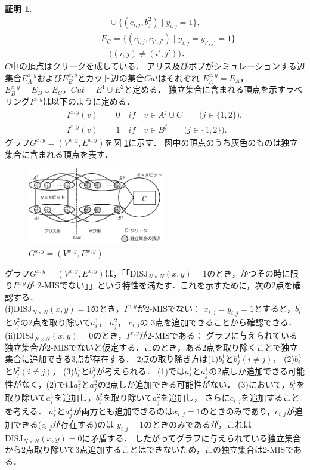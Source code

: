 \documentclass[11pt,a4paper]{jarticle}
\theoremstyle{definition}
\newtheorem*{prf*}{証明}
\begin{document}
\begin{prf*}
\begin{align*}
&\phantom{=} \quad \quad \cup \{(c_{i,j},b^{2}_{j}) \mid y_{i,j}=1\}, \\
&\phantom{=} \quad E_{C} = \{(c_{i,j}, c_{i',j'}) \mid y_{i,j}=y_{i',j'}=1\} \\
&\phantom{=} \quad \quad \text{($(i, j) \neq (i', j')$)}．
\end{align*}
$C$中の頂点はクリークを成している．
アリス及びボブがシミュレーションする辺集合$E^{x,y}_A$および$E^{x,y}_B$とカット辺の集合$\mathit{Cut}$はそれぞれ
$E^{x,y}_{A} = E_{A}$，$E^{x,y}_{B} = E_{B} \cup E_{C}$，$\mathit{Cut} = E^{1} \cup E^{2}$と定める．
独立集合に含まれる頂点を示すラベリング$I^{x,y}$は以下のように定める．
\begin{align*}
I^{x,y}(v) &= 0 \quad if \quad v \in A^{j} \cup C \quad \quad \text{($j \in \{1, 2\}$)}, \\
I^{x,y}(v) &= 1 \quad if \quad v \in B^{j} \quad \quad \text{($j \in \{1, 2\}$)}.
\end{align*}
グラフ$G^{x, y} = (V^{x,y}, E^{x,y})$を図 \ref{2_G(x,y)}に示す．
図中の頂点のうち灰色のものは独立集合に含まれる頂点を表す．
\begin{figure}[ht]
\begin{center}
\includegraphics[width=60mm]{2_Gxy.png}
\end{center}
\caption{$G^{x, y} = (V^{x,y}, E^{x,y})$}
\label{2_G(x,y)}
\end{figure}
グラフ$G^{x, y} = (V^{x,y}, E^{x,y})$は，「「$\mathrm{DISJ}_{N \times N} (x, y) = 1$のとき，かつその時に限り$I^{x,y}$が
2-MISでない」」という特性を満たす．これを示すために，次の2点を確認する． \\
(i)$\mathrm{DISJ}_{N \times N} (x, y) = 1$のとき，$I^{x,y}$が2-MISでない： 
$x_{i, j} = y_{i, j} =1$とすると，$b_{i}^{1}$と$b_{j}^{2}$の2点を取り除いて$a_{i}^{1}$， $a_{j}^{2}$， $c_{i, j}$の
3点を追加できることから確認できる． \\
(ii)$\mathrm{DISJ}_{N \times N} (x, y) = 0$のとき，$I^{x,y}$が2-MISである： 
グラフに与えられている独立集合が2-MISでないと仮定する．このとき，ある2点を取り除くことで独立集合に追加できる3点が存在する．
2点の取り除き方は(1)$b_{i}^{1}$と$b_{j}^{1}(i \neq j)$， (2)$b_{i}^{2}$と$b_{j}^{2}(i \neq j)$， (3)$b_{i}^{1}$と$b_{j}^{2}$が考えられる．
(1)では$a_{i}^{1}$と$a_{j}^{1}$の2点しか追加できる可能性がなく，(2)では$a_{i}^{2}$と$a_{j}^{2}$の2点しか追加できる可能性がない．
(3)において，$b_{i}^{1}$を取り除いて$a_{i}^{1}$を追加し，$b_{j}^{2}$を取り除いて$a_{j}^{2}$を追加し，
さらに$c_{i, j}$を追加することを考える．
$a_{i}^{1}$と$a_{j}^{2}$が両方とも追加できるのは$x_{i, j} = 1$のときのみであり，$c_{i, j}$が追加できる($c_{i, j}$が存在する)のは
$y_{i, j} = 1$のときのみであるが，これは$\mathrm{DISJ}_{N \times N} (x, y) = 0$に矛盾する．
したがってグラフに与えられている独立集合から2点取り除いて3点追加することはできないため，この独立集合は2-MISである．


\end{prf*}
\end{document}
